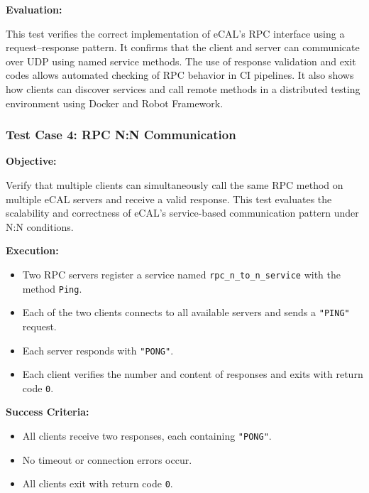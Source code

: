 \vspace{0.5em}
\textbf{Evaluation:}

\vspace{0.4em}
This test verifies the correct implementation of eCAL’s RPC interface using a request–response pattern. It confirms that the client and server can communicate over UDP using named service methods. The use of response validation and exit codes allows automated checking of RPC behavior in CI pipelines. It also shows how clients can discover services and call remote methods in a distributed testing environment using Docker and Robot Framework.

\subsubsection{Test Case 4: RPC N:N Communication}
\label{sec:tc4}

\textbf{Objective:}

\vspace{0.4em}
Verify that multiple clients can simultaneously call the same RPC method on multiple eCAL servers and receive a valid response. This test evaluates the scalability and correctness of eCAL’s service-based communication pattern under N:N conditions.

\vspace{0.5em}
\textbf{Execution:}
\begin{itemize}
	\item Two RPC servers register a service named \texttt{rpc\_n\_to\_n\_service} with the method \texttt{Ping}.
	\item Each of the two clients connects to all available servers and sends a \texttt{"PING"} request.
	\item Each server responds with \texttt{"PONG"}.
	\item Each client verifies the number and content of responses and exits with return code \texttt{0}.
\end{itemize}

\newpage

\vspace{0.4em}
\textbf{Success Criteria:}
\begin{itemize}
	\item All clients receive two responses, each containing \texttt{"PONG"}.
	\item No timeout or connection errors occur.
	\item All clients exit with return code \texttt{0}.
\end{itemize}

